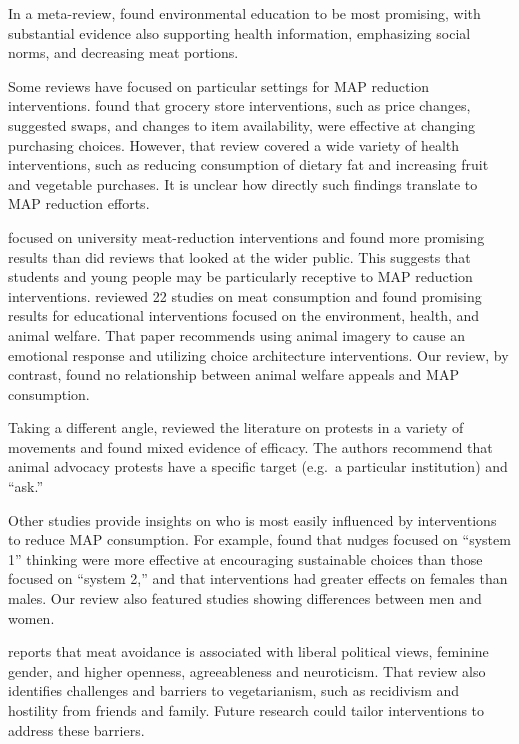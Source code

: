 \documentclass[sn-nature,referee,pdflatex]{sn-jnl}
\begin{document}
In a meta-review, \citep{grundy2022} found environmental education to be
most promising, with substantial evidence also supporting health
information, emphasizing social norms, and decreasing meat portions.

Some reviews have focused on particular settings for MAP reduction
interventions. \citep{hartmannboyce2018} found that grocery store
interventions, such as price changes, suggested swaps, and changes to
item availability, were effective at changing purchasing choices.
However, that review covered a wide variety of health interventions,
such as reducing consumption of dietary fat and increasing fruit and
vegetable purchases. It is unclear how directly such findings translate
to MAP reduction efforts.

\citep{chang2023} focused on university meat-reduction interventions and
found more promising results than did reviews that looked at the wider
public. This suggests that students and young people may be particularly
receptive to MAP reduction interventions. \citep{harguess2020} reviewed
22 studies on meat consumption and found promising results for
educational interventions focused on the environment, health, and animal
welfare. That paper recommends using animal imagery to cause an
emotional response and utilizing choice architecture interventions. Our
review, by contrast, found no relationship between animal welfare
appeals and MAP consumption.

Taking a different angle, \citep{adleberg2018} reviewed the literature
on protests in a variety of movements and found mixed evidence of
efficacy. The authors recommend that animal advocacy protests have a
specific target (e.g.~a particular institution) and ``ask.''

Other studies provide insights on who is most easily influenced by
interventions to reduce MAP consumption. For example,
\citep{blackford2021} found that nudges focused on ``system 1'' thinking
were more effective at encouraging sustainable choices than those
focused on ``system 2,'' and that interventions had greater effects on
females than males. Our review also featured studies showing differences
between men and women.

\citep{rosenfeld2018} reports that meat avoidance is associated with
liberal political views, feminine gender, and higher openness,
agreeableness and neuroticism. That review also identifies challenges
and barriers to vegetarianism, such as recidivism and hostility from
friends and family. Future research could tailor interventions to
address these barriers.
\end{document}
